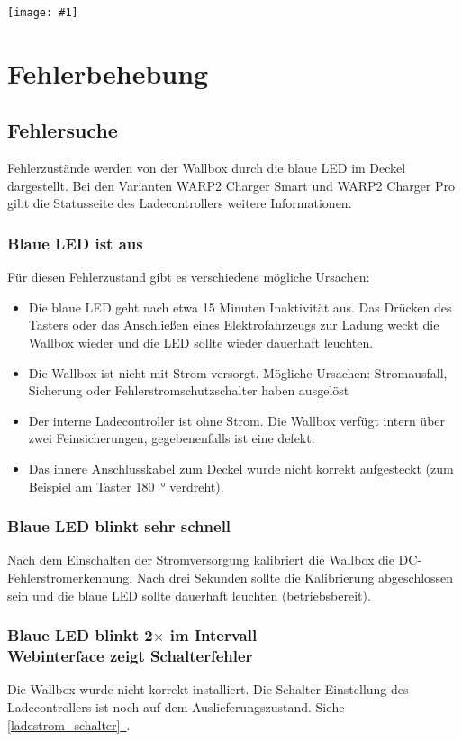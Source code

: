 \documentclass[a4paper,10pt]{article}
\newcommand{\gfx}[1]{\texttt{[image: \#1]}}
\newcommand*{\fullref}[1]{\hyperref[{#1}]{\ref*{#1}~\nameref*{#1}}}
\begin{document}
\begin{multicols*}{2}
	\gfx{./img_warp2/resized/web_charge_manager}

	\newpage \section{Fehlerbehebung}\label{fehlerbehebung} \subsection{Fehlersuche}
	Fehlerzustände werden von der Wallbox durch die blaue LED im Deckel
	dargestellt. Bei den Varianten WARP2 Charger Smart und WARP2 Charger Pro gibt die Statusseite des Ladecontrollers
	weitere Informationen.

	\subsubsection*{Blaue LED ist aus}
	Für diesen Fehlerzustand gibt es verschiedene mögliche Ursachen:
	\begin{itemize}
		\item Die blaue LED geht nach etwa 15 Minuten Inaktivität aus. Das Drücken des Tasters
		      oder das Anschließen eines Elektrofahrzeugs zur Ladung weckt die Wallbox wieder
		      und die LED sollte wieder dauerhaft leuchten.
		\item Die Wallbox ist nicht mit Strom versorgt. Mögliche Ursachen: Stromausfall,
		      Sicherung oder Fehlerstrom\-schutzschalter haben ausgelöst
		\item Der interne Ladecontroller ist ohne Strom. Die Wallbox verfügt intern über zwei
		      Feinsicherungen, gegebenenfalls ist eine defekt.
		\item Das innere Anschlusskabel zum Deckel wurde nicht korrekt aufgesteckt (zum Beispiel am Taster \SI{180}{\degree} verdreht).
	\end{itemize}

	\subsubsection*{Blaue LED blinkt sehr schnell}\label{fast_blink}
	Nach dem Einschalten der Stromversorgung kalibriert die Wallbox die
	DC-Fehlerstromerkennung. Nach drei Sekunden sollte die Kalibrierung
	abgeschlossen sein und die blaue LED sollte dauerhaft leuchten
	(betriebsbereit).

	\subsubsection*{Blaue LED blinkt 2$\times$ im Intervall \\ Webinterface zeigt Schalterfehler}
	Die Wallbox wurde nicht korrekt installiert. Die Schalter-Einstellung des Ladecontrollers ist
	noch auf dem Auslieferungszustand. Siehe \fullref{ladestrom_schalter}.


\end{multicols*}
\end{document}
